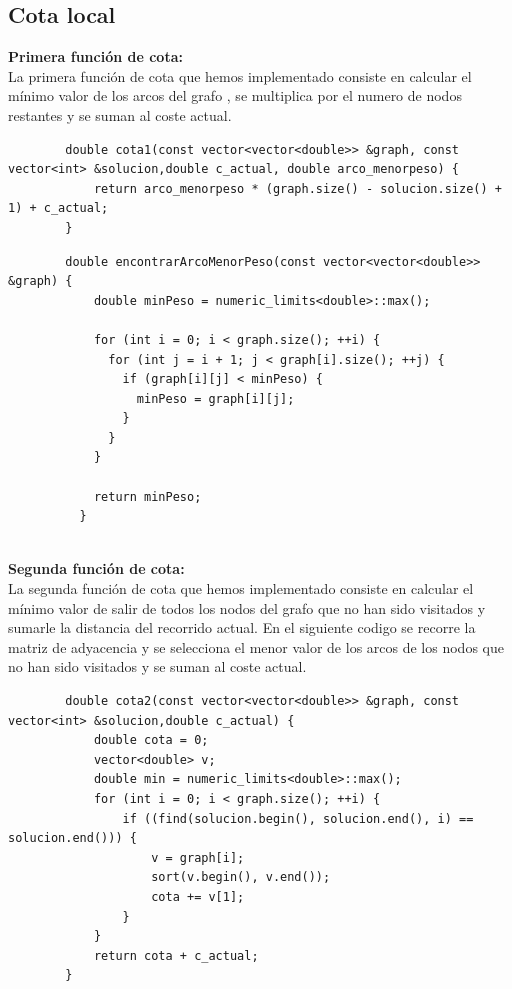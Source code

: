 \documentclass[11pt,openany]{book}
\begin{document}
\subsection{Cota local}
\textbf{Primera función de cota:} \\
    La primera función de cota que hemos implementado consiste en calcular el mínimo valor de los arcos del grafo ,
     se multiplica por el numero de nodos restantes y se suman al coste actual.
    \begin{lstlisting}
        double cota1(const vector<vector<double>> &graph, const vector<int> &solucion,double c_actual, double arco_menorpeso) {
            return arco_menorpeso * (graph.size() - solucion.size() + 1) + c_actual;
        }

    \end{lstlisting}
    \begin{lstlisting}
        double encontrarArcoMenorPeso(const vector<vector<double>> &graph) {
            double minPeso = numeric_limits<double>::max();
          
            for (int i = 0; i < graph.size(); ++i) {
              for (int j = i + 1; j < graph[i].size(); ++j) {
                if (graph[i][j] < minPeso) {
                  minPeso = graph[i][j];
                }
              }
            }
          
            return minPeso;
          }
          

    \end{lstlisting}
\textbf{Segunda función de cota:} \\
    La segunda función de cota que hemos implementado consiste en calcular el mínimo valor de salir de todos los nodos del grafo que no 
    han sido visitados y sumarle la distancia del recorrido actual.
    En el siguiente codigo se recorre la matriz de adyacencia y se selecciona el menor valor de los arcos de los nodos que no han sido visitados 
    y se suman al coste actual.
    \begin{lstlisting}
        double cota2(const vector<vector<double>> &graph, const vector<int> &solucion,double c_actual) {
            double cota = 0;
            vector<double> v;
            double min = numeric_limits<double>::max();
            for (int i = 0; i < graph.size(); ++i) {
                if ((find(solucion.begin(), solucion.end(), i) == solucion.end())) {
                    v = graph[i];
                    sort(v.begin(), v.end());
                    cota += v[1];
                }
            }
            return cota + c_actual;
        }
    \end{lstlisting}
\end{document}
